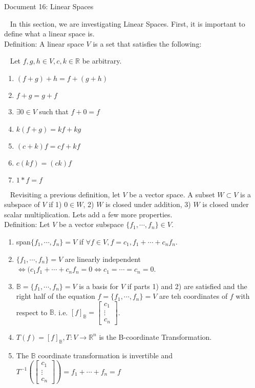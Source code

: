 \documentclass[11 pt]{article}
\begin{document}
\begin{center}
Document 16: Linear Spaces\\
\end{center}

\setlength{\leftskip}{0 in}
$\,\,\,$ In this section, we are investigating Linear Spaces. First, it is important to define what a linear space is.\\

Definition: A linear space $V$ is a set that satisfies the following:

$\,\,\,$ Let $f,g,h\in V,c,k\in\mathbb{R}$ be arbitrary.
\begin{enumerate}
\item $(f+g)+h=f+(g+h)$
\item $f+g=g+f$
\item $\exists 0\in V$ such that $f+0=f$
\item $k(f+g)=kf+kg$
\item $(c+k)f=cf+kf$
\item $c(kf)=(ck)f$
\item $1*f=f$
\end{enumerate}

$\,\,\,$ Revisiting a previous definition, let $V$ be a vector space. A subset $W\subset V$ is a subspace of $V$ if 1) $0\in W$, 2) $W$ is closed under addition, 3) $W$ is closed under scalar multiplication. Lets add a few more properties.\\

Definition: Let $V$ be a vector subspace $\lbrace f_1,\cdots,f_n\rbrace\in V$.
\begin{enumerate}
\item span$\lbrace f_1,\cdots,f_n\rbrace=V$ if $\forall f\in V,f=c_1,f_1+\cdots+c_nf_n$.
\item $\lbrace f_1,\cdots,f_n\rbrace=V$ are linearly independent $\Leftrightarrow (c_1f_1+\cdots+c_nf_n=0\Leftrightarrow c_1=\cdots=c_n=0$.
\item $\mathbb{B}=\lbrace f_1,\cdots,f_n\rbrace=V$ is a basis for $V$ if parts 1) and 2) are satisfied and the right half of the equation $f=\lbrace f_1,\cdots,f_n\rbrace=V$ are teh coordinates of $f$ with respect to $\mathbb{B}$. i.e. $[f]_\mathbb{B}=\begin{bmatrix}c_1\\\vdots\\c_n\end{bmatrix}$.
\item $T(f)=[f]_\mathbb{B},T:V\rightarrow\mathbb{R}^n$ is the B-coordinate Transformation.
\item The $\mathbb{B}$ coordinate transformation is invertible and $T^{-1}(\begin{bmatrix}c_1\\\vdots\\c_n\end{bmatrix})=f_1+\cdots+f_n=f$
\end{enumerate}
\end{document}
